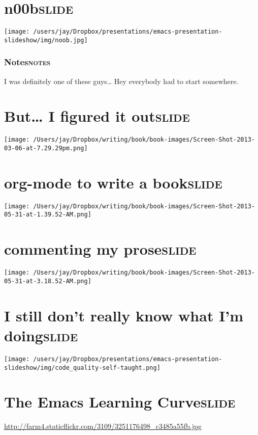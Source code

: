 \documentclass[11pt]{article}
\begin{document}
\section{n00b\hfill{}\textsc{slide}}
\label{sec:orgheadline32}
\texttt{[image: /users/jay/Dropbox/presentations/emacs-presentation-slideshow/img/noob.jpg]} 

\subsubsection{Notes\hfill{}\textsc{notes}}
\label{sec:orgheadline31}
I was definitely one of these guys\ldots{} Hey everybody had to start somewhere. 

\section{But\ldots{} I figured it out\hfill{}\textsc{slide}}
\label{sec:orgheadline33}
\texttt{[image: /Users/jay/Dropbox/writing/book/book-images/Screen-Shot-2013-03-06-at-7.29.29pm.png]} 

\section{org-mode to write a book\hfill{}\textsc{slide}}
\label{sec:orgheadline34}
\texttt{[image: /Users/jay/Dropbox/writing/book/book-images/Screen-Shot-2013-05-31-at-1.39.52-AM.png]} 

\section{commenting my prose\hfill{}\textsc{slide}}
\label{sec:orgheadline35}
\texttt{[image: /Users/jay/Dropbox/writing/book/book-images/Screen-Shot-2013-05-31-at-3.18.52-AM.png]} 


\section{I still don't really know what I'm doing\hfill{}\textsc{slide}}
\label{sec:orgheadline36}
\texttt{[image: /users/jay/Dropbox/presentations/emacs-presentation-slideshow/img/code\_quality-self-taught.png]} 

\section{The Emacs Learning Curve\hfill{}\textsc{slide}}
\label{sec:orgheadline38}
\url{http://farm4.staticflickr.com/3109/3251176498_c3485a55fb.jpg} 
\end{document}
